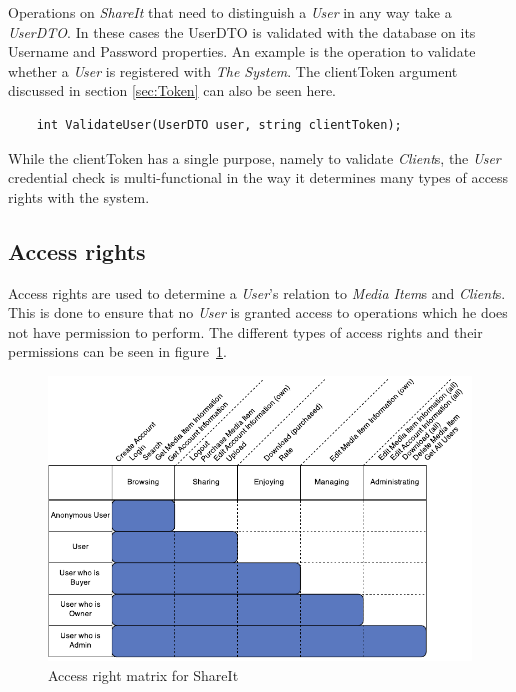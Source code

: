 \documentclass[../report.tex]{subfiles}
\begin{document}
Operations on \textit{ShareIt} that need to distinguish a \textit{User} in any way take a \textit{UserDTO}. In these cases the UserDTO is validated with the database on its Username and Password properties. An example is the operation to validate whether a \textit{User} is registered with \textit{The System}. The clientToken argument discussed in section \ref{sec:Token} can also be seen here. 

\begin{center}
\begin{lstlisting}
	int ValidateUser(UserDTO user, string clientToken);
\end{lstlisting}
\end{center}


While the clientToken has a single purpose, namely to validate \textit{Client}s, the \textit{User} credential check is multi-functional in the way it determines many types of access rights with the system.


\subsection{Access rights}


Access rights are used to determine a \textit{User}'s relation to \textit{Media Item}s and \textit{Client}s. This is done to ensure that no \textit{User} is granted access to operations which he does not have permission to perform. The different types of access rights and their permissions can be seen in figure~\ref{fig:accessrightmatrix}. 

\begin{figure}[H]
\centering \includegraphics{AccessRightMatrix.pdf}
\caption{Access right matrix for ShareIt}
\label{fig:accessrightmatrix}
\end{figure}
\end{document}
